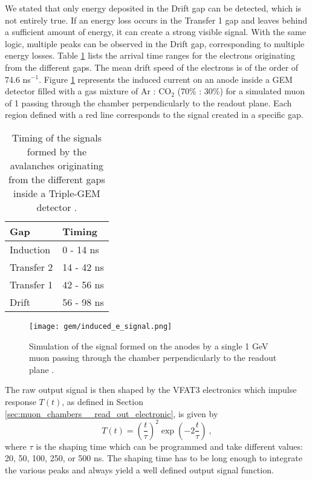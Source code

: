             We stated that only energy deposited in the Drift gap can be detected, which is not entirely true. If an energy loss occurs in the Transfer 1 gap and leaves behind a sufficient amount of energy, it can create a strong visible signal. With the same logic, multiple peaks can be observed in the Drift gap, corresponding to multiple energy losses. Table \ref{tab:gas_electron_multiplier_detectors__signal_timing} lists the arrival time ranges for the electrons originating from the different gaps. The mean drift speed of the electrons is of the order of 74.6 \um{} ns$ ^{-1} $. Figure \ref{fig:gas_electron_multiplier_detectors__raw_signal} represents the induced current on an anode inside a GEM detector filled with a gas mixture of Ar : CO$ _2 $ (70\% : 30\%) for a simulated muon of 1 \GeVc{} passing through the chamber perpendicularly to the readout plane. Each region defined with a red line corresponds to the signal created in a specific gap.

            \begin{table}[h!]
                \centering
                \begin{tabular}{l|l}
                    Gap & Timing \\ \hline
                    Induction & 0 - 14 ns \\
                    Transfer 2 & 14 - 42 ns \\
                    Transfer 1 & 42 - 56 ns \\
                    Drift & 56 - 98 ns 
                \end{tabular}
                \caption{Timing of the signals formed by the avalanches originating from the different gaps inside a Triple-GEM detector \Cite{GEM_Thierry_Pres}.}
                \label{tab:gas_electron_multiplier_detectors__signal_timing}
            \end{table}     

            \begin{figure}[h!]
                \centering
                \texttt{[image: gem/induced\_e\_signal.png]}
                \caption{Simulation of the signal formed on the anodes by a single 1 GeV muon passing through the chamber perpendicularly to the readout plane \Cite{These_Geoffrey}.}
                \label{fig:gas_electron_multiplier_detectors__raw_signal}
            \end{figure}                

            The raw output signal is then shaped by the VFAT3 electronics which impulse response $ T(t) $, as defined in Section \ref{sec:muon_chambers__read_out_electronic}, is given by
            \begin{equation} 
                T(t) = \left( \frac{t}{\tau} \right)^2 \exp\left(- 2 \frac{t}{\tau} \right) \ ,
                \label{eq:gas_electron_multiplier_detectors__transfert_function}
            \end{equation}
            where $ \tau $ is the shaping time which can be programmed and take different values: 20, 50, 100, 250, or 500 ns. The shaping time has to be long enough to integrate the various peaks and always yield a well defined output signal function. 

